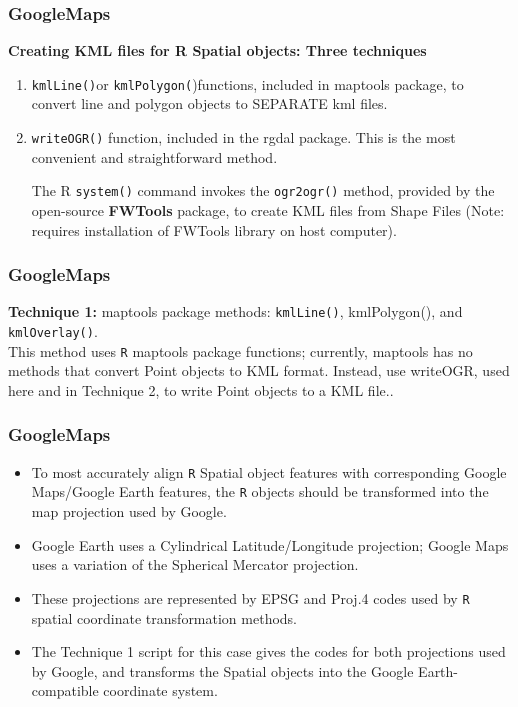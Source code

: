 \documentclass{beamer}
\begin{document}
\begin{frame}[fragile]
\frametitle{GoogleMaps}
\textbf{Creating KML files for R Spatial objects: Three techniques}
\begin{enumerate}
\item \texttt{kmlLine()}or \texttt{kmlPolygon(})functions, included in maptools package, to convert line and polygon objects to SEPARATE kml files.

\item \texttt{writeOGR()} function, included in the rgdal package. This is the most convenient and straightforward method.

The R \texttt{system()} command invokes the \texttt{ogr2ogr()} method,  provided by the open-source \textbf{FWTools}  package, to create KML files from Shape Files (Note: requires installation of FWTools library on host computer).
\end{enumerate}
\end{frame}
\begin{frame}[fragile]
\frametitle{GoogleMaps}
\textbf{Technique 1:} maptools package methods: \texttt{kmlLine()}, kmlPolygon(), and \texttt{kmlOverlay()}.
\\
\bigskip
This method uses \texttt{R} maptools package functions; currently, maptools has no methods that convert Point objects to KML format. 
Instead, use writeOGR, used here and in Technique 2, to write Point objects to a KML file..
\end{frame}
\begin{frame}[fragile]
\frametitle{GoogleMaps}
%
\begin{itemize}
\item To most accurately align \texttt{R} Spatial object features with corresponding Google Maps/Google Earth features, the \texttt{R} objects should be transformed into the map projection used by Google. \item Google Earth uses a Cylindrical Latitude/Longitude projection; Google Maps uses a variation of the Spherical Mercator projection. \item These projections are represented by EPSG and Proj.4 codes used by \texttt{R} spatial coordinate transformation methods. \item The Technique 1 script for this case gives the codes for both projections used by Google, and transforms the Spatial objects into the Google Earth-compatible coordinate system.
\end{itemize} 

\end{frame}
\end{document}
